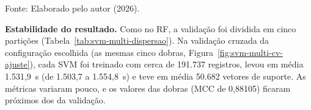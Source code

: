 \documentclass[
    12pt,                %
    openright,           %
    oneside,             %
    a4paper,             %
    english,             %
    brazil               %
]{abntex2}
\begin{document}
\begin{table}
\centering
\caption{Desempenho do SVM multiclasse selecionado por classe na validação}
\label{tab:svm-multi-validacao-classe}
\par\smallskip
Fonte: Elaborado pelo autor (2026).
\end{table}
 
\textbf{Estabilidade do resultado.} Como no RF, a validação foi dividida em cinco partições (Tabela~\ref{tab:svm-multi-dispersao}). Na validação cruzada da configuração escolhida (as mesmas cinco dobras, Figura~\ref{fig:svm-multi-cv-ajuste}), cada SVM foi treinado com cerca de 191.737 registros, levou em média 1.531,9~s (de 1.503,7 a 1.554,8~s) e teve em média 50.682 vetores de suporte. As métricas variaram pouco, e os valores das dobras (MCC de 0,88105) ficaram próximos dos da validação.
 
\end{document}
